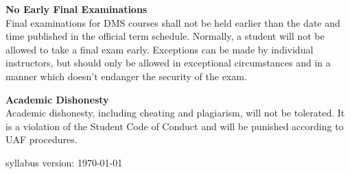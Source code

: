 \documentclass[12pt]{article}
\renewcommand{\emph}[1]{\textsf{\textbf{#1}}}
\newcommand{\localhead}[1]{\par\smallskip\textbf{#1}\nobreak\\}%
\def\subheading#1{\localhead{\emph{#1}}}
\begin{document}
\subheading{No Early Final Examinations}
Final examinations for DMS courses shall not be held earlier than the date and time published in the official term schedule. Normally, a student will not be allowed to take a final exam early. Exceptions can be made by individual instructors, but should only be allowed in exceptional circumstances and in a manner which doesn't endanger the security of the exam.

\subheading{Academic Dishonesty}
Academic dishonesty, including cheating and plagiarism, will not be tolerated.  It is a violation of the Student Code of Conduct and will be punished according to UAF procedures.

\vfill
\hfill \scriptsize syllabus version: \today \normalsize
\end{document}
